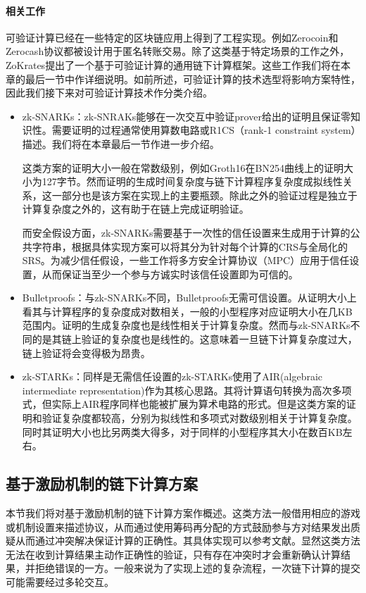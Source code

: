 \paragraph{相关工作}
可验证计算已经在一些特定的区块链应用上得到了工程实现。例如Zerocoin\cite{6547123}和Zerocash\cite{6956581}协议都被设计用于匿名转账交易。除了这类基于特定场景的工作之外，ZoKrates\cite{8726497}提出了一个基于可验证计算的通用链下计算框架。这些工作我们将在本章的最后一节中作详细说明。如前所述，可验证计算的技术选型将影响方案特性，因此我们接下来对可验证计算技术作分类介绍。
\begin{itemize}
    \setlength{\itemsep}{0pt}
    \setlength{\parsep}{0pt}
    \setlength{\parskip}{0pt}
    \item zk-SNARKs：zk-SNRAKs能够在一次交互中验证prover给出的证明且保证零知识性。需要证明的过程通常使用算数电路\cite{10.1145/2856449}或R1CS\cite{184425}（rank-1 constraint system）描述。我们将在本章最后一节作进一步介绍。
    
    这类方案的证明大小一般在常数级别，例如Groth16\cite{cryptoeprint:2016/260}在BN254曲线上的证明大小为127字节\cite{cryptoeprint:2005/133}。然而证明的生成时间复杂度与链下计算程序复杂度成拟线性关系，这一部分也是该方案在实现上的主要瓶颈。除此之外的验证过程是独立于计算复杂度之外的，这有助于在链上完成证明验证。

    而安全假设方面，zk-SNARKs需要基于一次性的信任设置来生成用于计算的公共字符串，根据具体实现方案可以将其分为针对每个计算的CRS与全局化的SRS。为减少信任假设，一些工作\cite{cryptoeprint:2017/1050, 7163032}将多方安全计算协议（MPC）应用于信任设置，从而保证当至少一个参与方诚实时该信任设置即为可信的。
    \item Bulletproofs：与zk-SNARKs不同，Bulletproofs\cite{8418611}无需可信设置。从证明大小上看其与计算程序的复杂度成对数相关，一般的小型程序对应证明大小在几KB范围内。证明的生成复杂度也是线性相关于计算复杂度。然而与zk-SNARKs不同的是其链上验证的复杂度也是线性的。这意味着一旦链下计算复杂度过大，链上验证将会变得极为昂贵。
    \item zk-STARKs：同样是无需信任设置的zk-STARKs\cite{cryptoeprint:2018/046}使用了AIR(algebraic intermediate representation)作为其核心思路。其将计算语句转换为高次多项式，但实际上AIR程序同样也能被扩展为算术电路的形式。但是这类方案的证明和验证复杂度都较高，分别为拟线性和多项式对数级别相关于计算复杂度。同时其证明大小也比另两类大得多，对于同样的小型程序其大小在数百KB左右。
\end{itemize}

\subsection{基于激励机制的链下计算方案}
本节我们将对基于激励机制的链下计算方案作概述。这类方法一般借用相应的游戏或机制设置来描述协议，从而通过使用筹码再分配的方式鼓励参与方对结果发出质疑从而通过冲突解决保证计算的正确性。其具体实现可以参考文献\cite{hurwicz_reiter_2006}。显然这类方法无法在收到计算结果主动作正确性的验证，只有存在冲突时才会重新确认计算结果，并拒绝错误的一方。一般来说为了实现上述的复杂流程，一次链下计算的提交可能需要经过多轮交互。


